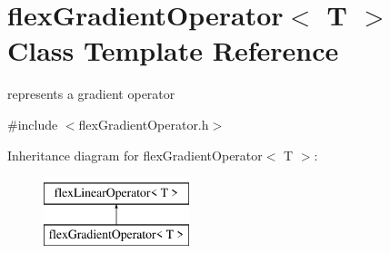 \hypertarget{classflex_gradient_operator}{}\section{flex\+Gradient\+Operator$<$ T $>$ Class Template Reference}
\label{classflex_gradient_operator}


represents a gradient operator  




{\ttfamily \#include $<$flex\+Gradient\+Operator.\+h$>$}

Inheritance diagram for flex\+Gradient\+Operator$<$ T $>$\+:\begin{figure}[H]
\begin{center}
\leavevmode
\includegraphics[height=2.000000cm]{classflex_gradient_operator}
\end{center}
\end{figure}

